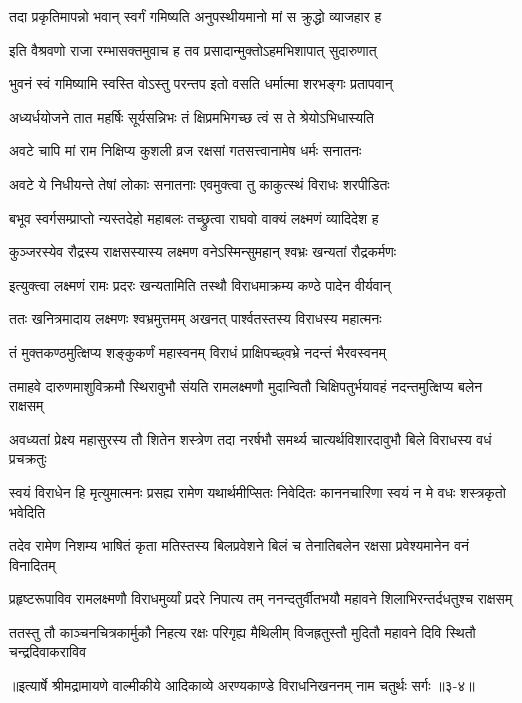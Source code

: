 \twolineshloka
{तदा प्रकृतिमापन्नो भवान् स्वर्गं गमिष्यति}
{अनुपस्थीयमानो मां स क्रुद्धो व्याजहार ह} %

\twolineshloka
{इति वैश्रवणो राजा रम्भासक्तमुवाच ह}
{तव प्रसादान्मुक्तोऽहमभिशापात् सुदारुणात्} %

\twolineshloka
{भुवनं स्वं गमिष्यामि स्वस्ति वोऽस्तु परन्तप}
{इतो वसति धर्मात्मा शरभङ्गः प्रतापवान्} %

\twolineshloka
{अध्यर्धयोजने तात महर्षिः सूर्यसन्निभः}
{तं क्षिप्रमभिगच्छ त्वं स ते श्रेयोऽभिधास्यति} %

\twolineshloka
{अवटे चापि मां राम निक्षिप्य कुशली व्रज}
{रक्षसां गतसत्त्वानामेष धर्मः सनातनः} %

\twolineshloka
{अवटे ये निधीयन्ते तेषां लोकाः सनातनाः}
{एवमुक्त्वा तु काकुत्स्थं विराधः शरपीडितः} %

\twolineshloka
{बभूव स्वर्गसम्प्राप्तो न्यस्तदेहो महाबलः}
{तच्छ्रुत्वा राघवो वाक्यं लक्ष्मणं व्यादिदेश ह} %

\twolineshloka
{कुञ्जरस्येव रौद्रस्य राक्षसस्यास्य लक्ष्मण}
{वनेऽस्मिन्सुमहान् श्वभ्रः खन्यतां रौद्रकर्मणः} %

\twolineshloka
{इत्युक्त्वा लक्ष्मणं रामः प्रदरः खन्यतामिति}
{तस्थौ विराधमाक्रम्य कण्ठे पादेन वीर्यवान्} %

\twolineshloka
{ततः खनित्रमादाय लक्ष्मणः श्वभ्रमुत्तमम्}
{अखनत् पार्श्वतस्तस्य विराधस्य महात्मनः} %

\twolineshloka
{तं मुक्तकण्ठमुत्क्षिप्य शङ्कुकर्णं महास्वनम्}
{विराधं प्राक्षिपच्छ्वभ्रे नदन्तं भैरवस्वनम्} %

\twolineshloka
{तमाहवे दारुणमाशुविक्रमौ स्थिरावुभौ संयति रामलक्ष्मणौ}
{मुदान्वितौ चिक्षिपतुर्भयावहं नदन्तमुत्क्षिप्य बलेन राक्षसम्} %

\twolineshloka
{अवध्यतां प्रेक्ष्य महासुरस्य तौ शितेन शस्त्रेण तदा नरर्षभौ}
{समर्थ्य चात्यर्थविशारदावुभौ बिले विराधस्य वधं प्रचक्रतुः} %

\twolineshloka
{स्वयं विराधेन हि मृत्युमात्मनः प्रसह्य रामेण यथार्थमीप्सितः}
{निवेदितः काननचारिणा स्वयं न मे वधः शस्त्रकृतो भवेदिति} %

\twolineshloka
{तदेव रामेण निशम्य भाषितं कृता मतिस्तस्य बिलप्रवेशने}
{बिलं च तेनातिबलेन रक्षसा प्रवेश्यमानेन वनं विनादितम्} %

\twolineshloka
{प्रहृष्टरूपाविव रामलक्ष्मणौ विराधमुर्व्यां प्रदरे निपात्य तम्}
{ननन्दतुर्वीतभयौ महावने शिलाभिरन्तर्दधतुश्च राक्षसम्} %

\twolineshloka
{ततस्तु तौ काञ्चनचित्रकार्मुकौ निहत्य रक्षः परिगृह्य मैथिलीम्}
{विजह्रतुस्तौ मुदितौ महावने दिवि स्थितौ चन्द्रदिवाकराविव} %


॥इत्यार्षे श्रीमद्रामायणे वाल्मीकीये आदिकाव्ये अरण्यकाण्डे विराधनिखननम् नाम चतुर्थः सर्गः ॥३-४॥
